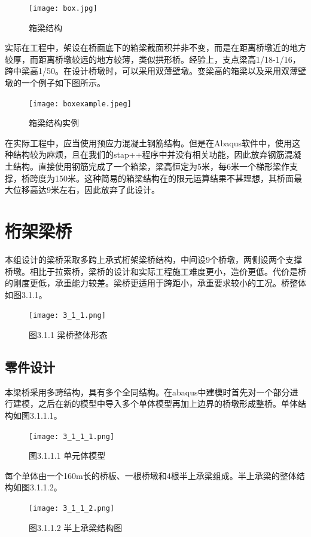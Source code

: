 \documentclass[forprint]{WHUBachelor}
\begin{document}
\begin{figure}[H]
\centering  
\texttt{[image: box.jpg]} 
\caption{箱梁结构} 
\label{3-1} 
\end{figure}

实际在工程中，架设在桥面底下的箱梁截面积并非不变，而是在距离桥墩近的地方较厚，而距离桥墩较远的地方较薄，类似拱形桥。经验上，支点梁高1/18-1/16，跨中梁高1/50。在设计桥墩时，可以采用双薄壁墩。变梁高的箱梁以及采用双薄壁墩的一个例子如下图所示。

\begin{figure}[H]
\centering  
\texttt{[image: boxexample.jpeg]} 
\caption{箱梁结构实例} 
\label{3-1} 
\end{figure}

在实际工程中，应当使用预应力混凝土钢筋结构。但是在Abaqus软件中，使用这种结构较为麻烦，且在我们的stap++程序中并没有相关功能，因此放弃钢筋混凝土结构。直接使用钢筋完成了一个箱梁，梁高恒定为5米，每6米一个梯形梁作支撑，桥跨度为150米。这种简易的箱梁结构在的限元运算结果不甚理想，其桥面最大位移高达9米左右，因此放弃了此设计。

\section{桁架梁桥}

本组设计的梁桥采取多跨上承式桁架梁桥结构，中间设9个桥墩，两侧设两个支撑桥墩。相比于拉索桥，梁桥的设计和实际工程施工难度更小，造价更低。代价是桥的刚度更低，承重能力较差。梁桥更适用于跨距小，承重要求较小的工况。桥整体如图3.1.1。
\begin{figure}[H]
\centering
\texttt{[image: 3\_1\_1.png]}
\caption{图3.1.1 梁桥整体形态}
\end{figure}


\subsection{零件设计}

本梁桥采用多跨结构，具有多个全同结构。在abaqus中建模时首先对一个部分进行建模，之后在新的模型中导入多个单体模型再加上边界的桥墩形成整桥。单体结构如图3.1.1.1。
\begin{figure}[H]
\centering
\texttt{[image: 3\_1\_1\_1.png]}
\caption{图3.1.1.1 单元体模型}
\end{figure}


每个单体由一个160m长的桥板、一根桥墩和4根半上承梁组成。半上承梁的整体结构如图3.1.1.2。
\begin{figure}[H]
\centering
\texttt{[image: 3\_1\_1\_2.png]}
\caption{图3.1.1.2 半上承梁结构图}
\end{figure}
\end{document}
